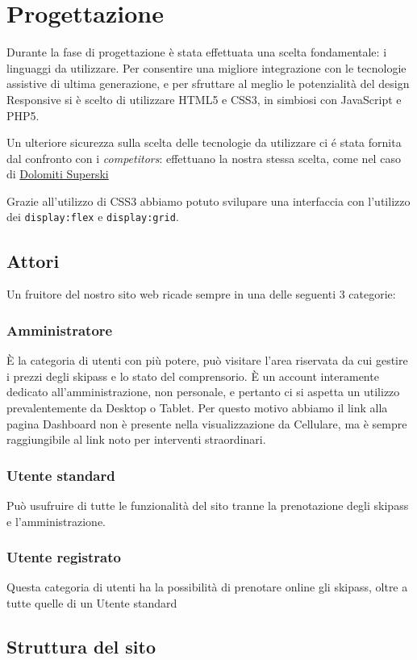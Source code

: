 \section{Progettazione}
Durante la fase di progettazione è stata effettuata una scelta fondamentale: i linguaggi da utilizzare. Per consentire una migliore integrazione con le tecnologie assistive di ultima generazione, e per sfruttare al meglio le potenzialità del design Responsive
si è scelto di utilizzare HTML5 e CSS3, in simbiosi con JavaScript e PHP5.

Un ulteriore sicurezza sulla scelta delle tecnologie da utilizzare  ci é stata fornita dal confronto con i \textit{competitors}: effettuano la nostra stessa scelta, come nel caso di \href{www.dolomitisuperski.com}{Dolomiti Superski}

Grazie all'utilizzo di CSS3 abbiamo potuto svilupare una interfaccia con l'utilizzo dei \verb|display:flex| e \verb|display:grid|.


\subsection{Attori}
Un fruitore del nostro sito web ricade sempre in una delle seguenti 3 categorie:
\subsubsection{Amministratore}
È la categoria di utenti con più potere, può visitare l'area riservata da cui gestire i prezzi degli skipass e lo stato del comprensorio.
È un account interamente dedicato all'amministrazione, non personale, e pertanto ci si aspetta un utilizzo prevalentemente da Desktop o Tablet. Per questo motivo abbiamo il link alla pagina Dashboard non è presente nella visualizzazione da Cellulare, ma è sempre raggiungibile al link noto per interventi straordinari.
\subsubsection{Utente standard}
Può usufruire di tutte le funzionalità del sito tranne la prenotazione degli skipass e l'amministrazione.
\subsubsection{Utente registrato}
Questa categoria di utenti ha la possibilità di prenotare online gli skipass, oltre a tutte quelle di un Utente standard

\subsection{Struttura del sito}

